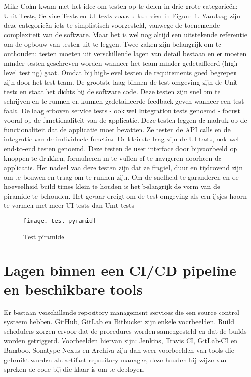         Mike Cohn kwam met het idee om testen op te delen in drie grote categorieën: Unit Tests, Service Tests en UI tests zoals u kan zien in Figuur \ref{img-test-pyramid}.
        Vandaag zijn deze categorieën iets te simplistisch voorgesteld, vanwege de toenemende complexiteit van de software. Maar het is wel nog altijd een uitstekende referentie om de opbouw van testen uit te leggen.
        Twee zaken zijn belangrijk om te onthouden: testen moeten uit verschillende lagen van detail bestaan en er moeten minder testen geschreven worden wanneer het team minder gedetailleerd (high-level testing) gaat. Omdat bij high-level testen de requirements goed begrepen zijn door het test team.
        De grootste laag binnen de test omgeving zijn de Unit tests en staat het dichts bij de software code. Deze testen zijn snel om te schrijven en te runnen en kunnen gedetailleerde feedback geven wanneer een test faalt.
        De laag erboven service tests - ook wel Integration tests genoemd - focust vooral op de functionaliteit van de applicatie.
        Deze testen leggen de nadruk op de functionaliteit dat de applicatie moet bevatten. Ze testen de API calls en de integratie van de individuele functies.
        De kleinste laag zijn de UI tests, ook wel end-to-end testen genoemd. Deze testen de user interface door bijvoorbeeld op knoppen te drukken, formulieren in te vullen of te navigeren doorheen de applicatie. Het nadeel van deze testen zijn dat ze fragiel, duur en tijdrovend zijn om te bouwen en traag om te runnen zijn.
        Om de snelheid te garanderen en de hoeveelheid build times klein te houden is het belangrijk de vorm van de piramide te behouden. Het gevaar dreigt om de test omgeving als een ijsjes hoorn te vormen met meer UI tests dan Unit tests ~\autocite{Fowler2012}.
        \begin{figure}	
            \texttt{[image: test-pyramid]}
            \caption{Test piramide ~\autocite{Vocke2018}} \label{img-test-pyramid}
        \end{figure}
    
    \section{Lagen binnen een CI/CD pipeline en beschikbare tools}
    \label{sec:lagen-binnen-pipeline}
    Er bestaan verschillende repository management services die een source control systeem hebben. GitHub, GitLab en Bitbucket zijn enkele voorbeelden.
    Build schedulers zorgen ervoor dat de procedures worden samengesteld en dat de builds worden getriggerd. Voorbeelden hiervan zijn: Jenkins, Travis CI, GitLab-CI en Bamboo. Sonatype Nexus en Archiva zijn dan weer voorbeelden van tools die gebruikt worden als artifact repository manager, deze houden bij wijze van spreken de code bij die klaar is om te deployen. 
    
